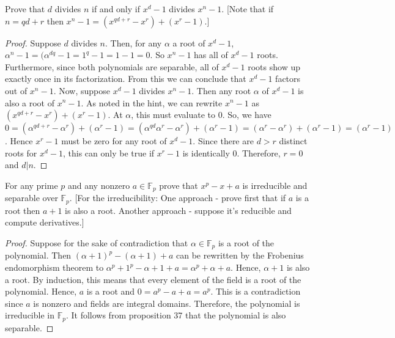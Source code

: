 \documentclass[10pt]{article}
\newenvironment{problem}[2][Problem]{\begin{trivlist}
		\item[\hskip \labelsep {\bfseries #1}\hskip \labelsep {\bfseries #2.}]}{\end{trivlist}}
\begin{document}
	\begin{problem}{5.3}
		Prove that $d$ divides $n$ if and only if $x^d - 1$ divides $x^n - 1$. [Note that if $n = qd + r$ then $x^n - 1 = (x^{qd+r} - x^r) + (x^r - 1 )$.]
		\begin{proof}
			Suppose $d$ divides $n$. Then, for any $\alpha$ a root of $x^d-1$, $\alpha^{n}-1 = (\alpha^{dq}-1 = 1^q-1 = 1-1=0$. So $x^n-1$ has all of $x^d-1$ roots. Furthermore, since both polynomials are separable, all of $x^d-1$ roots show up exactly once in its factorization. From this we can conclude that $x^d-1$ factors out of $x^n-1$.
			Now, suppose $x^d-1$ divides $x^n-1$. Then any root $\alpha$ of $x^d-1$ is also a root of $x^n-1$. As noted in the hint, we can rewrite $x^n-1$ as $(x^{qd+r}-x^r) + (x^r-1)$. At $\alpha$, this must evaluate to $0$. So, we have $0 = (\alpha^{qd+r}-\alpha^r) + (\alpha^r-1) = (\alpha^{qd}\alpha^r-\alpha^r) + (\alpha^r-1) = (\alpha^r-\alpha^r) + (\alpha^r-1) = (\alpha^r-1)$. Hence $x^r-1$ must be zero for any root of $x^d-1$. Since there are $d>r$ distinct roots for $x^d-1$, this can only be true if $x^r-1$ is identically $0$. Therefore, $r=0$ and $d|n$.
		\end{proof}
	\end{problem}
	
	\begin{problem}{5.5}
		For any prime $p$ and any nonzero $a \in \mathbb{F}_p$ prove that $x^p - x + a$ is irreducible and separable over $\mathbb{F}_p$. [For the irreducibility: One approach - prove first that if $a$ is a root then $a + 1$	is also a root. Another approach - suppose it's reducible and compute derivatives.]
		\begin{proof}
			Suppose for the sake of contradiction that $\alpha \in \mathbb{F}_p$ is a root of the polynomial. Then $(\alpha+1)^p - (\alpha + 1) + a$ can be rewritten by the Frobenius endomorphism theorem to $\alpha^p + 1^p - \alpha + 1 + a = \alpha^p + \alpha + a$. Hence, $\alpha+1$ is also a root. By induction, this means that every element of the field is a root of the polynomial. Hence, $a$ is a root and $0 = a^p -a + a = a^p$. This is a contradiction since $a$ is nonzero and fields are integral domains. Therefore, the polynomial is irreducible in $\mathbb{F}_p$. It follows from proposition 37 that the polynomial is also separable.
		\end{proof}
	\end{problem}
	
\end{document}
